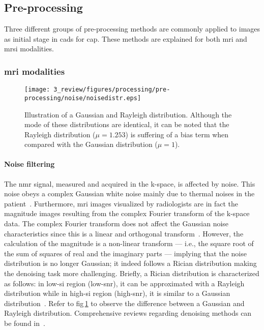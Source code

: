 \subsection{Pre-processing}\label{subsec:chp3img-reg:prepro}
Three different groups of pre-processing methods are commonly applied to images as initial stage in \acp{cad} for \ac{cap}.
These methods are explained for both \ac{mri} and \ac{mrsi} modalities.%


\subsubsection{\acs*{mri} modalities}\label{subsubsec:ch3:mriprepro}

\begin{figure}
\centering
	\texttt{[image: 3\_review/figures/processing/pre-processing/noise/noisedistr.eps]}
	\caption[Illustration of a Gaussian and Rayleigh distributions.]{Illustration of a Gaussian and Rayleigh distribution. Although the mode of these distributions are identical, it can be noted that the Rayleigh distribution ($\mu=1.253$) is suffering of a bias term when compared with the Gaussian distribution ($\mu=1$).}
	\label{fig:noisedistr}
\end{figure}

\paragraph{Noise filtering} The \ac{nmr} signal, measured and acquired in the k-space, is affected by noise.
This noise obeys a complex Gaussian white noise mainly due to thermal noises in the patient~\cite{Nowak1999}.
Furthermore, \ac{mri} images visualized by radiologists are in fact the magnitude images resulting from the complex Fourier transform of the k-space data.
The complex Fourier transform does not affect the Gaussian noise characteristics since this is a linear and orthogonal transform~\cite{Nowak1999}.
However, the calculation of the magnitude is a non-linear transform --- i.e., the square root of the sum of squares of real and the imaginary parts --- implying that the noise distribution is no longer Gaussian; it indeed follows a Rician distribution making the denoising task more challenging.
Briefly, a Rician distribution is characterized as follows: in low-\ac{si} region (low-\ac{snr}), it can be approximated with a Rayleigh distribution while in high-\ac{si} region (high-\ac{snr}), it is similar to a Gaussian distribution~\cite{Manjon2008}.
Refer to \acs{fig}\,\ref{fig:noisedistr} to observe the difference between a Gaussian and Rayleigh distribution.
Comprehensive reviews regarding denoising methods can be found in~\cite{Buades2005,Mohan2014}.

